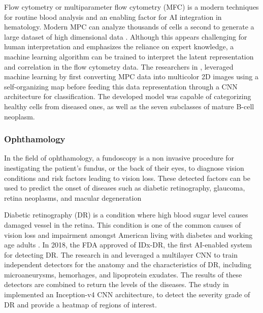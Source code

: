\documentclass{article}
\begin{document}
Flow cytometry or multiparameter flow cytometry (MFC) is a modern techniques for routine blood analysis and an enabling factor for AI integration in hematology.
Modern MPC can analyze thousands of cells a second to generate a large dataset of high dimensional data \cite{walter_artificial_2023}. 
Although this appears challenging for human interpretation and emphasizes the reliance on expert knowledge, a machine learning algorithm can be trained to interpret the latent representation and correlation in the flow cytometry data.
The researchers in \cite{zhao_hematologist-level_2020}, leveraged machine learning by first converting MPC data into multicolor 2D images using a self-organizing map before feeding this data representation through a CNN architecture for classification.
The developed model was capable of categorizing healthy cells from diseased ones, as well as the seven subclasses of mature B-cell neoplasm.

\subsubsection{Ophthamology}
In the field of ophthamology, a fundoscopy is a non invasive procedure for inestigating the patient's fundus, or the back of their eyes, to diagnose vision conditions and risk factors leading to vision loss.
These detected factors can be used to predict the onset of diseases such as diabetic retinography, glaucoma, retina neoplasms, and macular degeneration \cite{kumar_artificial_2023}

Diabetic retinography (DR) is a condition where high blood sugar level causes damaged vessel in the retina. 
This condition is one of the common causes of vision loss and impairment amongst American living with diabetes and working age adults \cite{commissioner_fda_2020,abramoff_pivotal_2018}.
In 2018, the FDA approved of IDx-DR, the first AI-enabled system for detecting DR.
The research in \cite{abramoff_improved_2016} and \cite{abramoff_pivotal_2018} leveraged a multilayer CNN to train independent detectors for the anatomy and the characteristics of DR, including microaneurysms, hemorhages, and lipoprotein exudates.
The results of these detectors are combined to return the levels of the diseases. 
The study in \cite{sayres_using_2019} implemented an Inception-v4 CNN architecture, to detect the severity grade of DR and provide a heatmap of regions of interest.
\end{document}
